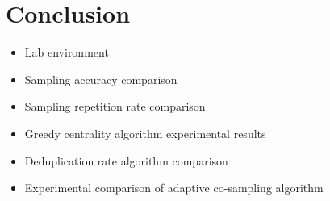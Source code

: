 \documentclass[conference,compsoc]{IEEEtran}
\begin{document}


 





 


\section{Conclusion}
\begin{itemize}
\item Lab environment
\item Sampling accuracy comparison
\item Sampling repetition rate comparison
\item Greedy centrality algorithm experimental results
 
\item Deduplication rate algorithm comparison

\item Experimental comparison of adaptive co-sampling algorithm
\end{itemize}






 






\end{document}
